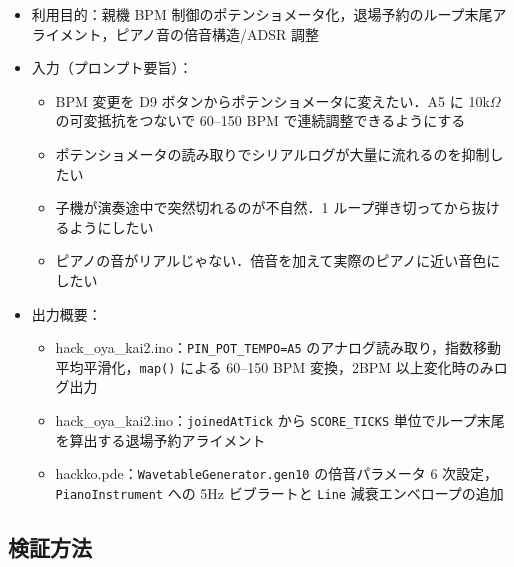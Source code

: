 \documentclass[a4paper,11pt]{ltjsarticle}
\providecommand{\％}{\%}
\begin{document}
\begin{itemize}
    \item 利用目的：親機 BPM 制御のポテンショメータ化，退場予約のループ末尾アライメント，ピアノ音の倍音構造/ADSR 調整
    \item 入力（プロンプト要旨）：
    \begin{itemize}
        \item BPM 変更を D9 ボタンからポテンショメータに変えたい．A5 に 10k$\Omega$ の可変抵抗をつないで 60--150 BPM で連続調整できるようにする
        \item ポテンショメータの読み取りでシリアルログが大量に流れるのを抑制したい
        \item 子機が演奏途中で突然切れるのが不自然．1 ループ弾き切ってから抜けるようにしたい
        \item ピアノの音がリアルじゃない．倍音を加えて実際のピアノに近い音色にしたい
    \end{itemize}
    \item 出力概要：
    \begin{itemize}
        \item hack\_oya\_kai2.ino：\texttt{PIN\_POT\_TEMPO=A5} のアナログ読み取り，指数移動平均平滑化，\texttt{map()} による 60--150 BPM 変換，2BPM 以上変化時のみログ出力
        \item hack\_oya\_kai2.ino：\texttt{joinedAtTick} から \texttt{SCORE\_TICKS} 単位でループ末尾を算出する退場予約アライメント
        \item hackko.pde：\texttt{WavetableGenerator.gen10} の倍音パラメータ 6 次設定，\texttt{PianoInstrument} への 5Hz ビブラートと \texttt{Line} 減衰エンベロープの追加
    \end{itemize}
\end{itemize}

\subsection{検証方法}\label{sec:ai-verify}
\end{document}
